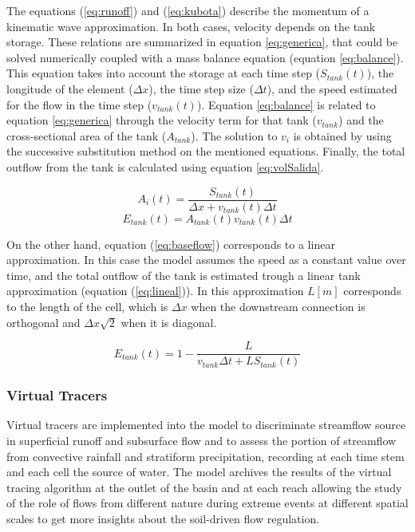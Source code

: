 \documentclass[hess, manuscript]{copernicus}
\begin{document}
The equations (\ref{eq:runoff}) and (\ref{eq:kubota}) describe the momentum of a kinematic wave approximation. In both cases, velocity depends on the tank storage. These relations are summarized in equation \ref{eq:generica},  that could be solved numerically coupled with a mass balance equation (equation \ref{eq:balance}). This equation takes into account the storage at each time step ($S_{tank}(t)$), the longitude of the element ($\Delta x$), the time step size ($\Delta t$), and the speed estimated for the flow in the time step ($v_{tank}(t)$).  Equation \ref{eq:balance} is related to equation \ref{eq:generica} through the velocity term for that tank ($v_{tank}$) and the cross-sectional area of the tank ($A_{tank}$).  The solution to $v_{i}$ is obtained by using the successive substitution method \citep{Chapra2012} on the mentioned equations.  Finally, the total outflow from the tank is calculated using equation \ref{eq:volSalida}.  

\begin{equation}
 A_i(t) = \frac{S_{tank}(t)}{\Delta x + v_{tank}(t) \Delta t}
    \label{eq:balance}
\end{equation}
\begin{equation}
    E_{tank}(t) =  A_{tank}(t) v_{tank}(t) \Delta t
     \label{eq:volSalida}
\end{equation}

On the other hand, equation (\ref{eq:baseflow}) corresponds to a linear approximation.  In this case the model assumes the speed as a constant value over time, and the total outflow of the tank is estimated trough a linear tank approximation (equation (\ref{eq:lineal})).  In this approximation $L [m]$ corresponds to the length of the cell, which is $\Delta x$ when the downstream connection is orthogonal and $\Delta x \sqrt{2}$ when it is diagonal. 

\begin{equation}
    E_{tank}(t) = 1 - \frac{L}{v_{tank}\Delta t + L S_{tank}(t)}
    \label{eq:lineal}
\end{equation}

\subsubsection{Virtual Tracers}

Virtual tracers are implemented into the model to discriminate streamflow source in superficial runoff and subsurface flow and to assess the portion of streamflow from convective rainfall and stratiform precipitation, recording at each time stem and each cell the source of water.  The model archives the results of the virtual tracing algorithm at the outlet of the basin and at each reach allowing the study of the role of flows from different nature during extreme events at different spatial scales to get more insights about the soil-driven flow regulation. \\
\end{document}
